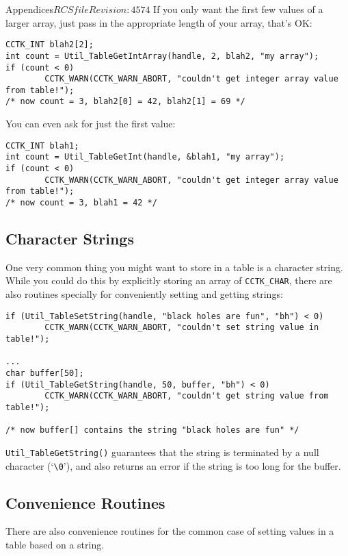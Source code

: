 \begin{cactuspart}{Appendices}{$RCSfile$}{$Revision: 4574 $}
If you only want the first few values of a larger array, just pass
in the appropriate length of your array,
that's OK:
\begin{verbatim}
CCTK_INT blah2[2];
int count = Util_TableGetIntArray(handle, 2, blah2, "my array");
if (count < 0)
        CCTK_WARN(CCTK_WARN_ABORT, "couldn't get integer array value from table!");
/* now count = 3, blah2[0] = 42, blah2[1] = 69 */
\end{verbatim}
You can even ask for just the first value:
\begin{verbatim}
CCTK_INT blah1;
int count = Util_TableGetInt(handle, &blah1, "my array");
if (count < 0)
        CCTK_WARN(CCTK_WARN_ABORT, "couldn't get integer array value from table!");
/* now count = 3, blah1 = 42 */
\end{verbatim}


\subsection{Character Strings}

One very common thing you might want to store in a table is a
character string.  While you could do this by explicitly storing
an array of \verb|CCTK_CHAR|, there are also routines
specially for conveniently setting and getting strings:
\begin{verbatim}
if (Util_TableSetString(handle, "black holes are fun", "bh") < 0)
        CCTK_WARN(CCTK_WARN_ABORT, "couldn't set string value in table!");

...
char buffer[50];
if (Util_TableGetString(handle, 50, buffer, "bh") < 0)
        CCTK_WARN(CCTK_WARN_ABORT, "couldn't get string value from table!");

/* now buffer[] contains the string "black holes are fun" */
\end{verbatim}

\verb|Util_TableGetString()| guarantees that the string is
terminated by a null character (`\verb|\0|'), and also returns an
error if the string is too long for the buffer.


\subsection{Convenience Routines}

There are also convenience routines for the common case of setting
values in a table based on a string.


\end{cactuspart}
